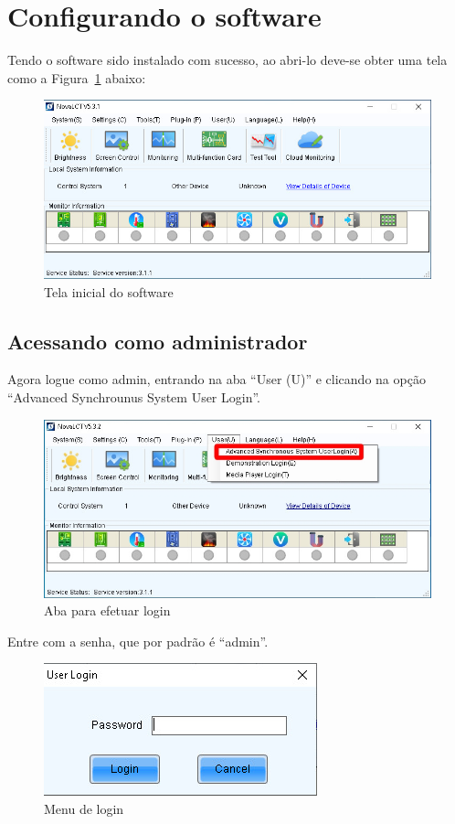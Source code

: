 \documentclass[12pt, a4paper]{article}
\begin{document}
\section{Configurando o software}\label{Configurando o software}
Tendo o software sido instalado com sucesso, ao abri-lo deve-se obter uma tela como a Figura~\ref{fig:CS1.jpeg} abaixo:
\begin{figure}[!htb]
	\centering
	\includegraphics[width=\textwidth]{CS1.jpeg}
	\caption{\label{fig:CS1.jpeg}Tela inicial do software}
\end{figure}

\newpage
\subsection{Acessando como administrador}\label{Acessando como administrador}
Agora logue como admin, entrando na aba ``User (U)'' e clicando na opção ``Advanced Synchrounus System User Login''.
\begin{figure}[!htb]
	\centering
	\includegraphics[width=\textwidth]{CS2.jpeg}
	\caption{\label{fig:CS2.jpeg}Aba para efetuar login}
\end{figure}

Entre com a senha, que por padrão é ``admin''.
\begin{figure}[!htb]
	\centering
	\includegraphics[width=.6\textwidth]{CS3.jpeg}
	\caption{\label{fig:CS3.jpeg}Menu de login}
\end{figure}
\end{document}
